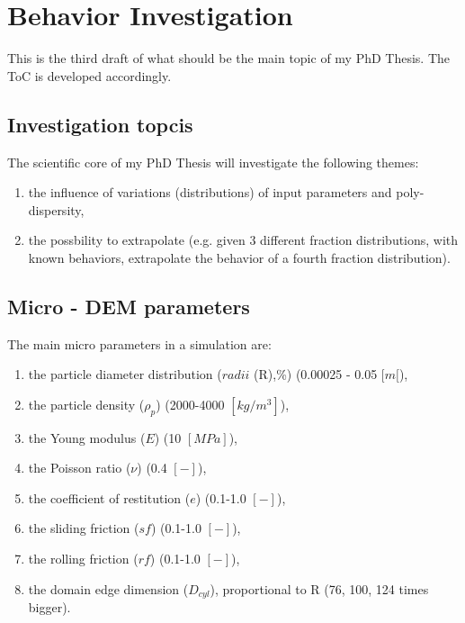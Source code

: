
\section{Behavior Investigation}
\label{section:behaviorinvestigation}

This is the third draft of what should be the main topic of my PhD Thesis. The ToC is developed accordingly.

\subsection{Investigation topcis}
\label{subsection:investigationtopics}

The scientific core of my PhD Thesis will investigate the following themes:
\begin{enumerate}
\item{the influence of variations (distributions) of input parameters and poly-dispersity,}
\item{the possbility to extrapolate (e.g. given 3 different fraction distributions, with known behaviors, extrapolate the behavior of a fourth fraction distribution).}
\end{enumerate}


\subsection{Micro - DEM parameters}
\label{subsection:microparameters}

The main micro parameters in a simulation are:

\begin{enumerate}[label=(\Alph*)]
\item{the particle diameter distribution ($radii$ (R),\%) (0.00025 - 0.05 $[m[$),}
\item{the particle density ($\rho_p$) (2000-4000 $[kg/m^3]$),}
\item{the Young modulus ($E$) (10 $[MPa]$),}
\item{the Poisson ratio ($\nu$) (0.4 $[-]$),}
\item{the coefficient of restitution ($e$) (0.1-1.0 $[-]$),}
\item{the sliding friction ($sf$) (0.1-1.0 $[-]$),}
\item{the rolling friction ($rf$) (0.1-1.0 $[-]$),}
\item{the domain edge dimension ($D_{cyl}$), proportional to R (76, 100, 124 times bigger).}
\end{enumerate}

